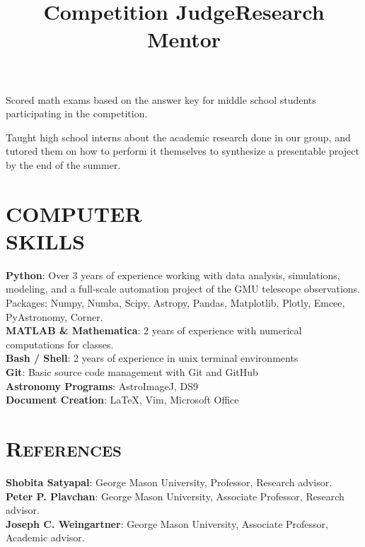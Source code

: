 \documentclass[marg, centered]{res}
\begin{document}
\begin{resume}
\title{\textbf{Competition Judge}}
\begin{position}
Scored math exams based on the answer key for middle school students participating in the competition.
\end{position}

\vspace{-0.3cm}
\title{\textbf{Research Mentor}}
\begin{position}
Taught high school interns about the academic research done in our group, and tutored them on how to perform it themselves to synthesize a presentable project by the end of the summer.
\end{position}


\newpage
\section{COMPUTER\\SKILLS}

\textbf{Python}: Over 3 years of experience working with data analysis, simulations, modeling, and a full-scale automation project of the GMU telescope observations. Packages: Numpy, Numba, Scipy, Astropy, Pandas, Matplotlib, Plotly, Emcee, PyAstronomy, Corner. \\
\textbf{MATLAB \& Mathematica}: 2 years of experience with numerical computations for classes. \\
\textbf{Bash / Shell}{: 2 years of experience in unix terminal environments} \\
\textbf{Git}{: Basic source code management with Git and GitHub} \\
\textbf{Astronomy Programs}{: AstroImageJ, DS9} \\
\textbf{Document Creation}{: \LaTeX, Vim, Microsoft Office} \\


\section{{\scshape \bfseries References}}
\textbf{Shobita Satyapal}{: George Mason University, Professor, Research advisor.}\\
\textbf{Peter P. Plavchan}{: George Mason University, Associate Professor, Research advisor.}\\
\textbf{Joseph C. Weingartner}{: George Mason University,  Associate Professor, Academic advisor.}\\

\end{resume}
\end{document}
